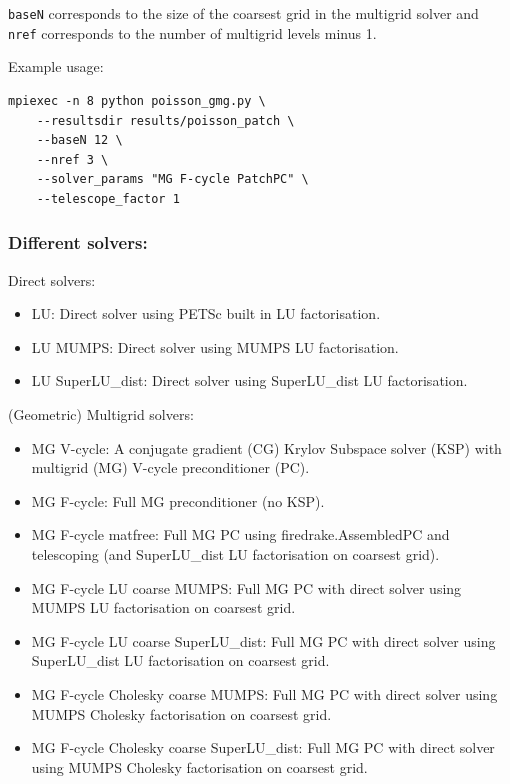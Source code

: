 \documentclass[a4paper,11pt]{article}
\begin{document}
\verb`baseN` corresponds to the size of the coarsest grid in the multigrid solver and \verb`nref` corresponds to the number of multigrid levels minus 1.

Example usage:

\begin{lstlisting}
mpiexec -n 8 python poisson_gmg.py \
    --resultsdir results/poisson_patch \
    --baseN 12 \
    --nref 3 \
    --solver_params "MG F-cycle PatchPC" \
    --telescope_factor 1
\end{lstlisting}

\subsubsection*{Different solvers:}
Direct solvers:
\begin{itemize}
	\item LU: Direct solver using PETSc built in LU factorisation.
    \item LU MUMPS: Direct solver using MUMPS LU factorisation.
	\item LU SuperLU\_dist: Direct solver using SuperLU\_dist LU factorisation.
\end{itemize}

\noindent(Geometric) Multigrid solvers:
\begin{itemize}
	\item MG V-cycle: A conjugate gradient (CG) Krylov Subspace solver (KSP) with multigrid (MG) V-cycle preconditioner (PC).
    \item MG F-cycle: Full MG preconditioner (no KSP).
    \item MG F-cycle matfree: Full MG PC using firedrake.AssembledPC and telescoping (and SuperLU\_dist LU factorisation on coarsest grid).
    \item MG F-cycle LU coarse MUMPS: Full MG PC with direct solver using MUMPS LU factorisation on coarsest grid.
    \item MG F-cycle LU coarse SuperLU\_dist: Full MG PC with direct solver using SuperLU\_dist LU factorisation on coarsest grid.
    \item MG F-cycle Cholesky coarse MUMPS: Full MG PC with direct solver using MUMPS Cholesky factorisation on coarsest grid.
    \item MG F-cycle Cholesky coarse SuperLU\_dist: Full MG PC with direct solver using MUMPS Cholesky factorisation on coarsest grid.
\end{itemize}
\end{document}
